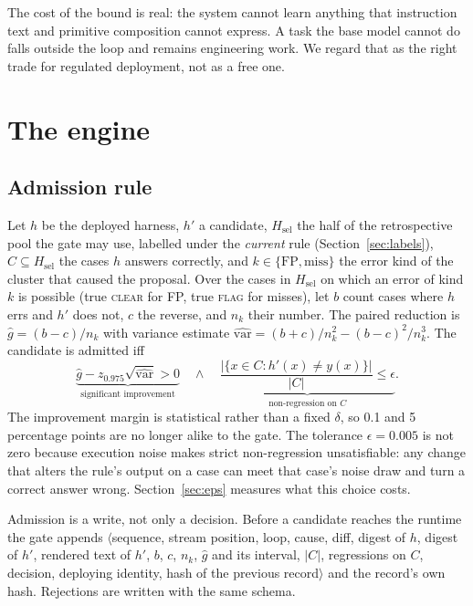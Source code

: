 \documentclass[11pt]{article}
\newcommand{\Hsel}{H_{\mathrm{sel}}}
\begin{document}
The cost of the bound is real: the system cannot learn anything that instruction text and primitive composition cannot express. A task the base model cannot do falls outside the loop and remains engineering work. We regard that as the right trade for regulated deployment, not as a free one.

\section{The engine}
\label{sec:engine}

\subsection{Admission rule}

Let $h$ be the deployed harness, $h'$ a candidate, $\Hsel$ the half of the retrospective pool the gate may use, labelled under the \emph{current} rule (Section~\ref{sec:labels}), $C \subseteq \Hsel$ the cases $h$ answers correctly, and $k \in \{\mathrm{FP},\mathrm{miss}\}$ the error kind of the cluster that caused the proposal. Over the cases in $\Hsel$ on which an error of kind $k$ is possible (true \textsc{clear} for FP, true \textsc{flag} for misses), let $b$ count cases where $h$ errs and $h'$ does not, $c$ the reverse, and $n_k$ their number. The paired reduction is $\hat g = (b-c)/n_k$ with variance estimate $\widehat{\mathrm{var}} = (b+c)/n_k^2 - (b-c)^2/n_k^3$. The candidate is admitted iff
\begin{equation}
\label{eq:gate}
\underbrace{\hat g - z_{0.975}\sqrt{\widehat{\mathrm{var}}} > 0}_{\text{significant improvement}}
\quad\wedge\quad
\underbrace{\frac{|\{x \in C : h'(x) \neq y(x)\}|}{|C|} \le \epsilon}_{\text{non-regression on } C}.
\end{equation}
The improvement margin is statistical rather than a fixed $\delta$, so 0.1 and 5 percentage points are no longer alike to the gate. The tolerance $\epsilon = 0.005$ is not zero because execution noise makes strict non-regression unsatisfiable: any change that alters the rule's output on a case can meet that case's noise draw and turn a correct answer wrong. Section~\ref{sec:eps} measures what this choice costs.

Admission is a write, not only a decision. Before a candidate reaches the runtime the gate appends $\langle$sequence, stream position, loop, cause, diff, digest of $h$, digest of $h'$, rendered text of $h'$, $b$, $c$, $n_k$, $\hat g$ and its interval, $|C|$, regressions on $C$, decision, deploying identity, hash of the previous record$\rangle$ and the record's own hash. Rejections are written with the same schema.
\end{document}
